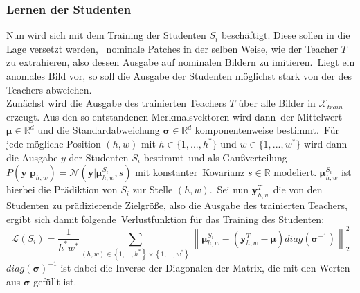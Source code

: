 \subsubsection*{Lernen der Studenten}
Nun wird sich mit dem Training der Studenten $S_{i}$ beschäftigt. Diese sollen in die Lage versetzt werden, \
nominale Patches in der selben Weise, wie der Teacher $T$ zu extrahieren, also dessen Ausgabe auf nominalen Bildern zu imitieren.\
Liegt ein anomales Bild vor, so soll die Ausgabe der Studenten möglichst stark von der des Teachers abweichen.\\
Zunächst wird die Ausgabe des trainierten Teachers $T$ über alle Bilder in $\mathcal{X}_{train}$ erzeugt. Aus den so entstandenen Merkmalsvektoren wird dann\
der Mittelwert $\boldsymbol{\mu}\in\mathbb{R}^{d}$ und die Standardabweichung $\mathbf{\sigma}\in\mathbb{R}^{d}$ komponentenweise bestimmt.\
Für jede mögliche Position $(h,w)$ mit $h\in\{1,...,h^{*}\}$ und $w\in\{1,...,w^{*}\}$ wird dann die Ausgabe $y$ der Studenten $S_{i}$ bestimmt\
und als Gaußverteilung $P\left(\mathbf{y}|\mathbf{p}_{h,w}\right)=\mathcal{N}\left(\mathbf{y}|\boldsymbol{\mu}^{S_{i}}_{h,w},s\right)$ mit konstanter\ 
Kovarianz $s\in\mathbb{R}$ modeliert. $\boldsymbol{\mu}^{S_{i}}_{h,w}$ ist hierbei die Prädiktion von $S_{i}$ zur Stelle $\left(h,w\right)$.\
Sei nun $\mathbf{y}^{T}_{h,w}$ die von den Studenten zu prädizierende Zielgröße, also die Ausgabe des trainierten Teachers, ergibt sich damit folgende\
Verlustfunktion für das Training des Studenten:\\
$$
\mathcal{L}\left(S_{i}\right)= \frac{1}{h^{*}w^{*}} \sum_{\left(h,w\right)\in \left\{1,...,h^{*}\right\} \times \left\{1,...,w^{*}\right\}} \left\lVert \boldsymbol{\mu}^{S_{i}}_{h,w} - \left(\mathbf{y}_{h,w}^{T}-\boldsymbol{\mu}\right)diag\left(\boldsymbol{\sigma}^{-1}\right) \right\rVert_{2}^{2}
$$
$diag\left(\boldsymbol{\sigma}\right)^{-1}$ ist dabei die Inverse der Diagonalen der Matrix, die mit den Werten aus $\boldsymbol{\sigma}$ gefüllt ist.\
